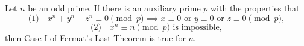Let $n$ be an odd prime. If there is an auxiliary prime $p$ with the properties that
\[
\text{(1)}\quad x^n + y^n + z^n \equiv 0 \pmod{p} \implies x \equiv 0 \text{ or } y \equiv 0 \text{ or } z \equiv 0 \pmod{p},
\]
\[
\text{(2)}\quad x^n \equiv n \pmod{p} \text{ is impossible},
\]
then Case I of Fermat's Last Theorem is true for $n$.
